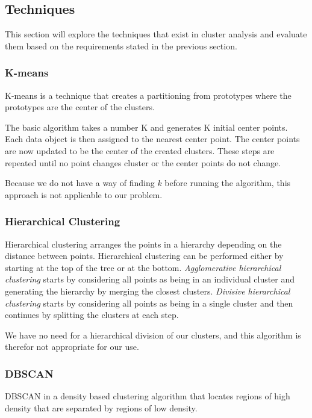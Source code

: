 \subsection{Techniques}
This section will explore the techniques that exist in cluster analysis and evaluate them based on the requirements stated in the previous section.

\subsubsection{K-means}
K-means is a technique that creates a partitioning from prototypes where the prototypes are the center of the clusters.

The basic algorithm takes a number K and generates K initial center points.
Each data object is then assigned to the nearest center point.
The center points are now updated to be the center of the created clusters.
These steps are repeated until no point changes cluster or the center points do not change.

Because we do not have a way of finding $ k $ before running the algorithm, this approach is not applicable to our problem.

\subsubsection{Hierarchical Clustering}
Hierarchical clustering arranges the points in a hierarchy depending on the distance between points.
Hierarchical clustering can be performed either by starting at the top of the tree or at the bottom.
\textit{Agglomerative hierarchical clustering} starts by considering all points as being in an individual cluster and generating the hierarchy by merging the closest clusters. 
\textit{Divisive hierarchical clustering} starts by considering all points as being in a single cluster and then continues by splitting the clusters at each step.

We have no need for a hierarchical division of our clusters, and this algorithm is therefor not appropriate for our use.

\subsubsection{DBSCAN}\label{clustering:DBSCAN}
DBSCAN in a density based clustering algorithm that locates regions of high density that are separated by regions of low density.

